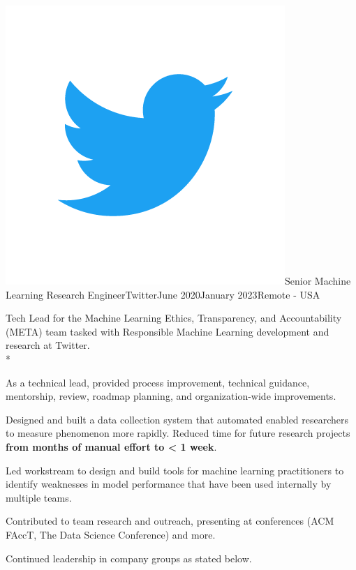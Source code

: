 \documentclass[print]{friggeri-cv} %
\newcommand{\twittericon}{\includegraphics[scale=0.05]{Twitter_Logo_Blue.png}}%
\begin{document}
\begin{job}
  {\twittericon}{Senior Machine Learning Research Engineer}{Twitter}{June 2020}{January 2023}{Remote - USA}{
      Tech Lead for the Machine Learning Ethics, Transparency, and Accountability
      (META) team tasked with Responsible Machine Learning development and
      research at Twitter.\\*
      \begin{myitemize}
        \item As a technical lead, provided process improvement, technical guidance,
        mentorship, review, roadmap planning, and organization-wide improvements. 
        
        \item Designed and built a data collection system that
        automated enabled researchers to measure phenomenon more rapidly. Reduced time
        for future research projects \textbf{from months of manual effort to < 1 week}.
        
        \item Led workstream to design and build tools for machine learning
        practitioners to identify weaknesses in model performance that have been
        used internally by multiple teams.
        
        \item Contributed to team research\autocite{twitter_htl_racial_bias}\autocite{twitter_recsys_distributional_inequality}
        and outreach, presenting at conferences (ACM FAccT\autocite{facct_2022_talk}, The Data Science Conference\autocite{datascience_2022_talk})
        and more\autocite{privacy_enchancing_tech_post}.
        \item Continued leadership in company groups as stated below.

      \end{myitemize}
  }
  \end{job}
\end{document}
